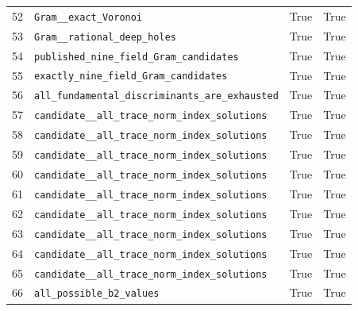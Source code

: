 \documentclass[12pt]{amsart}
\theoremstyle{remark}
\theoremstyle{definition}
\numberwithin{equation}{section}
\begin{document}
\begin{longtable}{rL{11cm}cc}
52 & \texttt{Gram\_\_\allowbreak exact\_\allowbreak Voronoi} & True & True \\
53 & \texttt{Gram\_\_\allowbreak rational\_\allowbreak deep\_\allowbreak holes} & True & True \\
54 & \texttt{published\_\allowbreak nine\_\allowbreak field\_\allowbreak Gram\_\allowbreak candidates} & True & True \\
55 & \texttt{exactly\_\allowbreak nine\_\allowbreak field\_\allowbreak Gram\_\allowbreak candidates} & True & True \\
56 & \texttt{all\_\allowbreak fundamental\_\allowbreak discriminants\_\allowbreak are\_\allowbreak exhausted} & True & True \\
57 & \texttt{candidate\_\_\allowbreak all\_\allowbreak trace\_\allowbreak norm\_\allowbreak index\_\allowbreak solutions} & True & True \\
58 & \texttt{candidate\_\_\allowbreak all\_\allowbreak trace\_\allowbreak norm\_\allowbreak index\_\allowbreak solutions} & True & True \\
59 & \texttt{candidate\_\_\allowbreak all\_\allowbreak trace\_\allowbreak norm\_\allowbreak index\_\allowbreak solutions} & True & True \\
60 & \texttt{candidate\_\_\allowbreak all\_\allowbreak trace\_\allowbreak norm\_\allowbreak index\_\allowbreak solutions} & True & True \\
61 & \texttt{candidate\_\_\allowbreak all\_\allowbreak trace\_\allowbreak norm\_\allowbreak index\_\allowbreak solutions} & True & True \\
62 & \texttt{candidate\_\_\allowbreak all\_\allowbreak trace\_\allowbreak norm\_\allowbreak index\_\allowbreak solutions} & True & True \\
63 & \texttt{candidate\_\_\allowbreak all\_\allowbreak trace\_\allowbreak norm\_\allowbreak index\_\allowbreak solutions} & True & True \\
64 & \texttt{candidate\_\_\allowbreak all\_\allowbreak trace\_\allowbreak norm\_\allowbreak index\_\allowbreak solutions} & True & True \\
65 & \texttt{candidate\_\_\allowbreak all\_\allowbreak trace\_\allowbreak norm\_\allowbreak index\_\allowbreak solutions} & True & True \\
66 & \texttt{all\_\allowbreak possible\_\allowbreak b2\_\allowbreak values} & True & True \\

\end{longtable}
\end{document}
